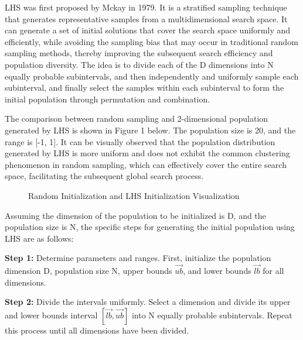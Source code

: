 \documentclass[preprint,review,compress,12pt]{elsarticle}
\begin{document}
LHS was first proposed by Mckay \cite{mckay1979comparison} in 1979. It is a stratified sampling technique that generates representative samples from a multidimensional search space. It can generate a set of initial solutions that cover the search space uniformly and efficiently, while avoiding the sampling bias that may occur in traditional random sampling methods, thereby improving the subsequent search efficiency and population diversity. The idea is to divide each of the D dimensions into N equally probable subintervals, and then independently and uniformly sample each subinterval, and finally select the samples within each subinterval to form the initial population through permutation and combination.

The comparison between random sampling and 2-dimensional population generated by LHS is shown in Figure 1 below. The population size is 20, and the range is [-1, 1]. It can be visually observed that the population distribution generated by LHS is more uniform and does not exhibit the common clustering phenomenon in random sampling, which can effectively cover the entire search space, facilitating the subsequent global search process.

\begin{figure}[H]
\centering
{}
\quad
{}
\caption{Random Initialization and LHS Initialization Visualization}
\end{figure}

Assuming the dimension of the population to be initialized is D, and the population size is N, the specific steps for generating the initial population using LHS are as follows:

{\bf Step 1:} Determine parameters and ranges. First, initialize the population dimension D, population size N, upper bounds $\vec{ub}$, and lower bounds $\vec{lb}$ for all dimensions.

{\bf Step 2:} Divide the intervals uniformly. Select a dimension and divide its upper and lower bounds interval $[\vec{lb}, \vec{ub}]$ into N equally probable subintervals. Repeat this process until all dimensions have been divided.
\end{document}
